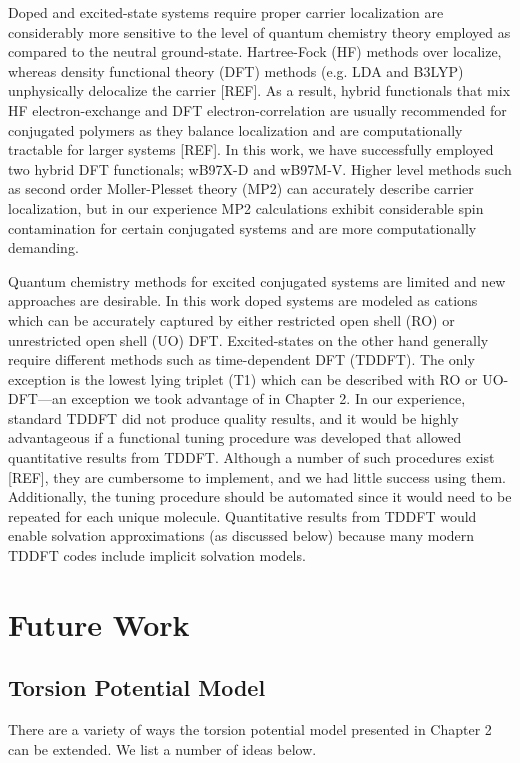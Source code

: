 Doped and excited-state systems require proper carrier localization are considerably more sensitive to the level of quantum chemistry theory employed as compared to the neutral ground-state. Hartree-Fock (HF) methods over localize, whereas density functional theory (DFT) methods (e.g. LDA and B3LYP) unphysically delocalize the carrier [REF]. As a result, hybrid functionals that mix HF electron-exchange and DFT electron-correlation are usually recommended for conjugated polymers as they balance localization and are computationally tractable for larger systems [REF]. In this work, we have successfully employed two hybrid DFT functionals; wB97X-D and wB97M-V. Higher level methods such as second order Moller-Plesset theory (MP2) can accurately describe carrier localization, but in our experience MP2 calculations exhibit considerable spin contamination for certain conjugated systems and are more computationally demanding.

Quantum chemistry methods for excited conjugated systems are limited and new approaches are desirable. In this work doped systems are modeled as cations which can be accurately captured by either restricted open shell (RO) or unrestricted open shell (UO) DFT. Excited-states on the other hand generally require different methods such as time-dependent DFT (TDDFT). The only exception is the lowest lying triplet (T1) which can be described with RO or UO-DFT---an exception we took advantage of in Chapter 2. In our experience, standard TDDFT did not produce quality results, and it would be highly advantageous if a functional tuning procedure was developed that allowed quantitative results from TDDFT. Although a number of such procedures exist [REF], they are cumbersome to implement, and we had little success using them. Additionally, the tuning procedure should be automated since it would need to be repeated for each unique molecule. Quantitative results from TDDFT would enable solvation approximations (as discussed below) because many modern TDDFT codes include implicit solvation models.

\section{Future Work}

\subsection{Torsion Potential Model}

There are a variety of ways the torsion potential model presented in Chapter 2 can be extended. We list a number of ideas below.

